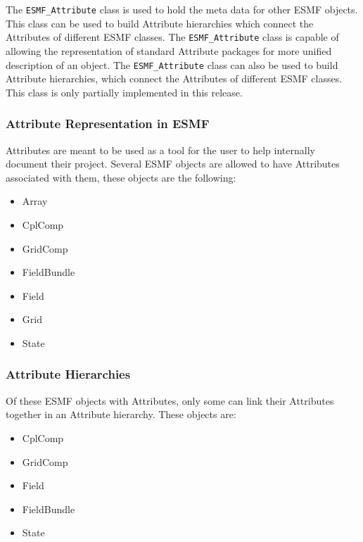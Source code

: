 %

The {\tt ESMF\_Attribute} class is used to hold the meta data for other ESMF objects.  This class can be used to build Attribute hierarchies which connect the Attributes of different ESMF classes.  The {\tt ESMF\_Attribute} class is capable of allowing the representation of standard Attribute packages for more unified description of an object.  The {\tt ESMF\_Attribute} class can also be used to build Attribute hierarchies, which connect the Attributes of different ESMF classes.  This class is only partially implemented in this release.

\subsubsection{Attribute Representation in ESMF}

Attributes are meant to be used as a tool for the user to help internally document their project.   Several ESMF objects are allowed to have Attributes associated with them, these objects are the following:

\begin{itemize}
\item Array
\item CplComp
\item GridComp
\item FieldBundle
\item Field
\item Grid
\item State
\end{itemize}

\subsubsection{Attribute Hierarchies}

Of these ESMF objects with Attributes, only some can link their Attributes together in an Attribute hierarchy.  These objects are:

\begin{itemize}
\item CplComp
\item GridComp
\item Field
\item FieldBundle
\item State
\end{itemize}

